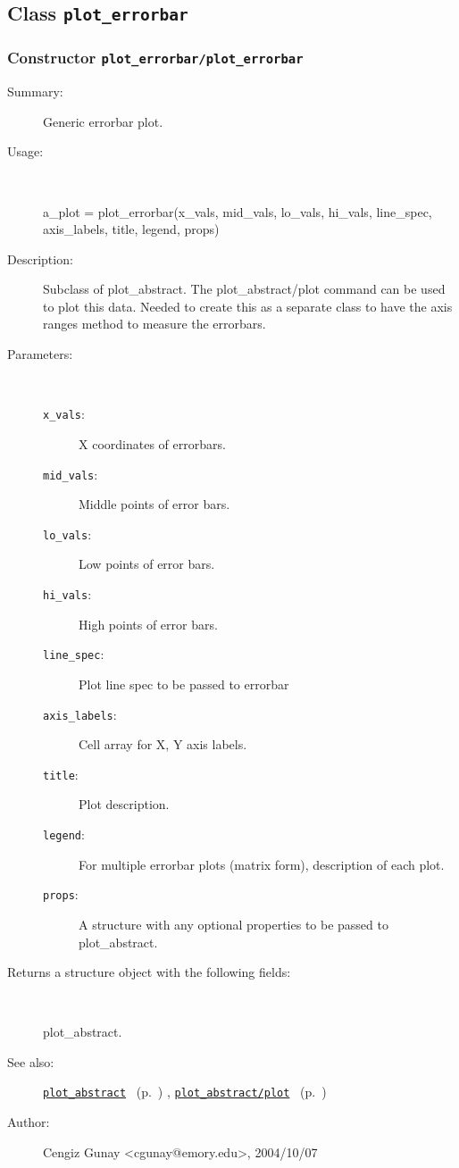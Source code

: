 \subsection{Class \texttt{plot\_errorbar}}%
%
\label{ref_plot_errorbar}%
\hypertarget{ref_plot_errorbar}{}%
\subsubsection[Constructor \texttt{plot\_errorbar}]{Constructor \texttt{plot\_errorbar/plot\_errorbar}}%
%
\label{ref_plot_errorbar__plot_errorbar}%
\hypertarget{ref_plot_errorbar__plot_errorbar}{}%
\begin{description}
\item[Summary:]Generic errorbar plot.
%
\item[Usage:]~%
\begin{lyxcode}%
a\_plot = plot\_errorbar(x\_vals, mid\_vals, lo\_vals, hi\_vals, line\_spec, 
			 axis\_labels, title, legend, props)
%
\end{lyxcode}%
%
\item[Description:]%
Subclass of plot\_abstract. The plot\_abstract/plot command can be used to
 plot this data. Needed to create this as a separate class to have the
 axis ranges method to measure the errorbars.
\item[Parameters:]~
\begin{description}%
\item[\texttt{x\_vals}:]
 X coordinates of errorbars.
\item[\texttt{mid\_vals}:]
 Middle points of error bars.
\item[\texttt{lo\_vals}:]
 Low points of error bars.
\item[\texttt{hi\_vals}:]
 High points of error bars.
\item[\texttt{line\_spec}:]
 Plot line spec to be passed to errorbar
\item[\texttt{axis\_labels}:]
 Cell array for X, Y axis labels.
\item[\texttt{title}:]
 Plot description.
\item[\texttt{legend}:]
 For multiple errorbar plots (matrix form), description of each plot.
\item[\texttt{props}:]
 A structure with any optional properties to be passed to plot\_abstract.
\end{description}%
%
\item[Returns a structure object with the following fields:]~

	plot\_abstract.
%
%
\item[See also:]%
\hyperlink{ref_plot_abstract}{\texttt{plot\_abstract}}%
\ (p.~\pageref{ref_plot_abstract})%
%
, \hyperlink{ref_plot_abstract__plot}{\texttt{plot\_abstract/plot}}%
\ (p.~\pageref{ref_plot_abstract__plot})%
%
%
\item[Author:]%
Cengiz Gunay <cgunay@emory.edu>, 2004/10/07%
\end{description}
\methodline%
